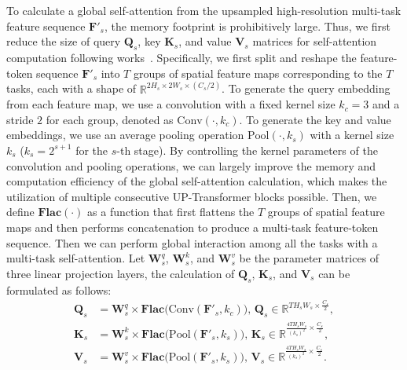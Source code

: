 \documentclass[runningheads]{llncs}
\begin{document}
\par To calculate a global self-attention from the upsampled high-resolution multi-task feature sequence $\mathbf{F}'_s$, the memory footprint is prohibitively large. Thus, we first reduce the size of query $\mathbf{Q}_s$, key $\mathbf{K}_s$, and value $\mathbf{V}_s$ matrices for self-attention computation following works~\cite{pvt,cvt}.
Specifically, we first split and reshape the feature-token sequence $\mathbf{F}'_s$ into $T$ groups of spatial feature maps corresponding to the $T$ tasks, each with a shape of $\mathbb{R}^{2H_s\times 2W_s \times (C_s/2)}$. To generate the query embedding from each feature map, we use a convolution with a fixed kernel size $k_c=3$ and a stride $2$ for each group, denoted as $\mathrm{Conv}(\cdot, k_c)$. To generate the key and value embeddings, we use an average pooling operation $\mathrm{Pool}(\cdot, k_s)$ with a kernel size $k_s$ ($k_s = 2^{s+1}$ for the $s$-th stage). By controlling the kernel parameters of the convolution and pooling operations, we can largely improve the memory and computation efficiency of the global self-attention calculation, which makes the utilization of multiple consecutive UP-Transformer blocks possible.
Then, we define $\mathbf{Flac}(\cdot)$ as a function that first flattens the $T$ groups of spatial feature maps and then performs concatenation to produce a multi-task feature-token sequence. Then we can perform global interaction among all the tasks with a multi-task self-attention. Let $\mathbf{W}_s^q$, $\mathbf{W}_s^k$, and $\mathbf{W}_s^v$ be the parameter matrices of three linear projection layers, the calculation of $\mathbf{Q}_s$, $\mathbf{K}_s$, and $\mathbf{V}_s$ can be formulated as follows:
\begin{equation}
\begin{aligned}
\mathbf{Q}_s &= \mathbf{W}^q_s \times \mathbf{Flac}\big(\mathrm{Conv}(\mathbf{F}'_s, k_c)\big), \, \mathbf{Q}_s \in \mathbb{R}^{{TH_s W_s} \times \frac{C_s}{2}}, \\
\mathbf{K}_s &= \mathbf{W}^k_s \times \mathbf{Flac}\big(\mathrm{Pool}(\mathbf{F}'_s, k_s)\big), \, \mathbf{K}_s \in \mathbb{R}^{\frac{4TH_sW_s}{(k_s)^2} \times \frac{C_s}{2}},\\
\mathbf{V}_s &= \mathbf{W}^v_s \times \mathbf{Flac}\big(\mathrm{Pool}(\mathbf{F}'_s, k_s)\big), \, \mathbf{V}_s \in \mathbb{R}^{\frac{4TH_s W_s}{(k_s)^2} \times \frac{C_s}{2}}.
\end{aligned}
\end{equation}
\end{document}
